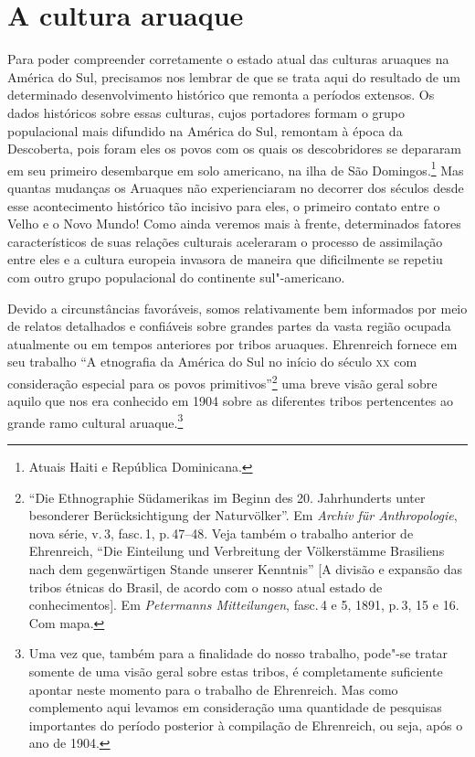 
\chapter*{A cultura aruaque\smallskip{}}

Para poder compreender corretamente o estado atual das culturas aruaques
na América do Sul, precisamos nos lembrar de que se trata aqui do
resultado de um determinado desenvolvimento histórico que remonta a
períodos extensos. Os dados históricos sobre essas culturas, cujos
portadores formam o grupo populacional mais difundido na América do Sul,
remontam à época da Descoberta, pois foram eles os povos com os quais os
descobridores se depararam em seu primeiro desembarque em solo americano,
na ilha de São Domingos.\footnote{Atuais Haiti e República Dominicana.} Mas quantas mudanças os Aruaques não experienciaram no
decorrer dos séculos desde esse acontecimento histórico tão incisivo
para eles, o primeiro contato entre o Velho e o Novo Mundo! Como ainda veremos mais à frente,
determinados fatores característicos de suas relações culturais
aceleraram o processo de assimilação entre eles e a cultura europeia
invasora de maneira que dificilmente se repetiu com outro grupo
populacional do continente sul"-americano.

Devido a circunstâncias favoráveis, somos relativamente bem informados
por meio de relatos detalhados e confiáveis sobre grandes partes da
vasta região ocupada atualmente ou em tempos anteriores por tribos
aruaques. Ehrenreich fornece em seu trabalho ``A etnografia da América do Sul no
início do século \textsc{xx} com consideração especial para os povos
primitivos''\footnote{``Die Ethnographie
Südamerikas im Beginn des 20. Jahrhunderts unter besonderer
Berücksichtigung der Naturvölker''. Em \textit{Archiv für Anthropologie}, nova série,
  v.\,3, fasc.\,1, p.\,47--48. Veja também o trabalho anterior de
  Ehrenreich, ``Die Einteilung und Verbreitung der Völkerstämme
  Brasiliens nach dem gegenwärtigen Stande unserer Kenntnis'' {[}A
  divisão e expansão das tribos étnicas do Brasil, de acordo com o nosso
  atual estado de conhecimentos{]}. Em \textit{Petermanns Mitteilungen},
  fasc.\,4 e 5, 1891, p.\,3, 15 e 16. Com mapa.} uma breve visão
geral sobre aquilo que nos era conhecido em 1904 sobre as diferentes
tribos pertencentes ao grande ramo cultural aruaque.\footnote{Uma vez que, também
para a finalidade do nosso trabalho, pode"-se tratar somente de uma
visão geral sobre estas tribos, é completamente suficiente apontar neste
momento para o trabalho de Ehrenreich. Mas como complemento aqui
levamos em consideração uma quantidade de pesquisas importantes do
período posterior à compilação de Ehrenreich, ou seja, após o ano de
1904.}

